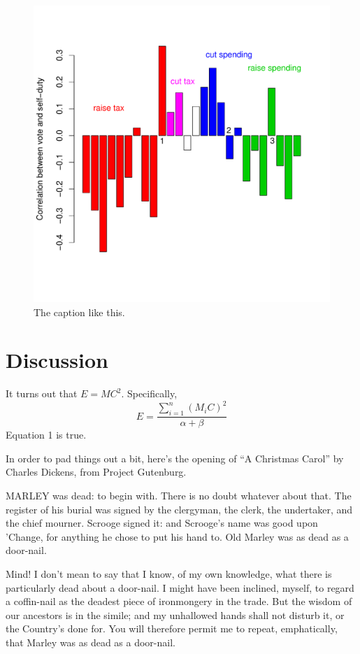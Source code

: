 \documentclass[twocolumn]{article}
\begin{document}
\begin{figure}[t!]\centering
\includegraphics[width=5in]{dut11.pdf}
\caption{The caption like this.}
\end{figure}

\section{Discussion}

It turns out that $E = MC^2$.  Specifically,
\begin{equation}
E = \frac { \sum_{i=1}^n ( M_i C )^2 }{ \alpha + \beta }
\end{equation}
Equation 1 is true.

In order to pad things out a bit, here's the opening of ``A Christmas Carol'' by Charles Dickens, from Project Gutenburg.

MARLEY was dead: to begin with. There is no doubt
whatever about that. The register of his burial was
signed by the clergyman, the clerk, the undertaker,
and the chief mourner. Scrooge signed it: and
Scrooge's name was good upon 'Change, for anything he
chose to put his hand to. Old Marley was as dead as a
door-nail.

Mind! I don't mean to say that I know, of my
own knowledge, what there is particularly dead about
a door-nail. I might have been inclined, myself, to
regard a coffin-nail as the deadest piece of ironmongery
in the trade. But the wisdom of our ancestors
is in the simile; and my unhallowed hands
shall not disturb it, or the Country's done for. You
will therefore permit me to repeat, emphatically, that
Marley was as dead as a door-nail.
\end{document}
